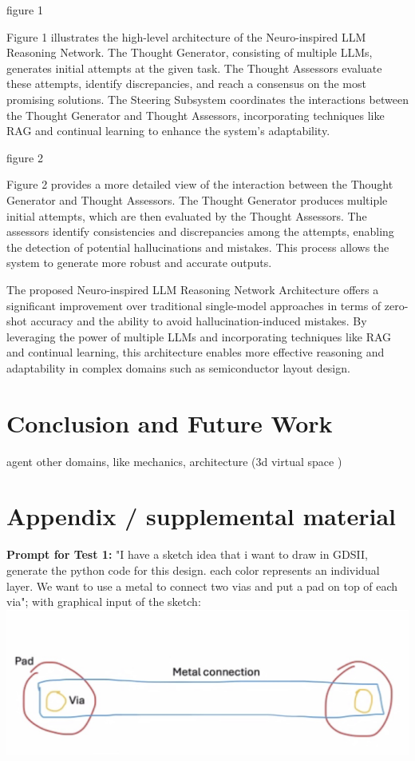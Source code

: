 \documentclass{article}
\begin{document}
figure 1

Figure 1 illustrates the high-level architecture of the Neuro-inspired LLM Reasoning Network. The Thought Generator, consisting of multiple LLMs, generates initial attempts at the given task. The Thought Assessors evaluate these attempts, identify discrepancies, and reach a consensus on the most promising solutions. The Steering Subsystem coordinates the interactions between the Thought Generator and Thought Assessors, incorporating techniques like RAG and continual learning to enhance the system's adaptability.

figure 2

Figure 2 provides a more detailed view of the interaction between the Thought Generator and Thought Assessors. The Thought Generator produces multiple initial attempts, which are then evaluated by the Thought Assessors. The assessors identify consistencies and discrepancies among the attempts, enabling the detection of potential hallucinations and mistakes. This process allows the system to generate more robust and accurate outputs.

The proposed Neuro-inspired LLM Reasoning Network Architecture offers a significant improvement over traditional single-model approaches in terms of zero-shot accuracy and the ability to avoid hallucination-induced mistakes. By leveraging the power of multiple LLMs and incorporating techniques like RAG and continual learning, this architecture enables more effective reasoning and adaptability in complex domains such as semiconductor layout design.

\section{Conclusion and Future Work}
agent \cite{Ho2024-cd}
other domains, like mechanics, architecture (3d virtual space \cite{Sasazawa2024-wf})

\printbibliography %

\newpage
\appendix

\section{Appendix / supplemental material}
\textbf{Prompt for Test 1:}
"I have a sketch idea that i want to draw in GDSII, generate the python code for this design. each color represents an individual layer. We want to use a metal to connect two vias and put a pad on top of each via"; with graphical input of the sketch:
\includegraphics[width=0.5\linewidth]{sketch.png}
\end{document}
